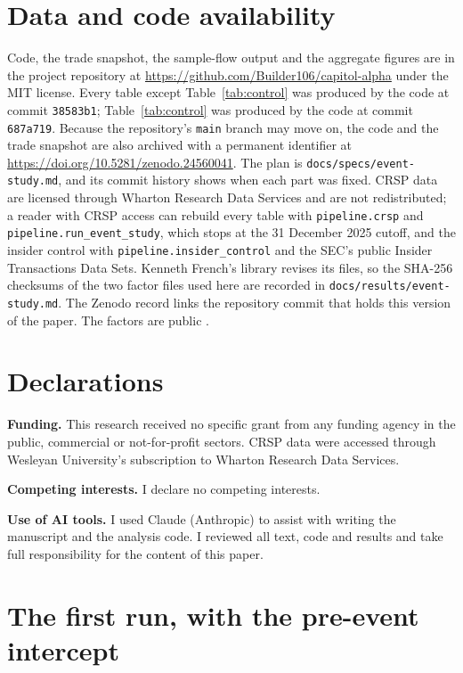 \documentclass[11pt]{article}
\begin{document}
\section*{Data and code availability}

Code, the trade snapshot, the sample-flow output and the aggregate figures are in the project repository at \url{https://github.com/Builder106/capitol-alpha} under the MIT license. Every table except Table~\ref{tab:control} was produced by the code at commit \texttt{38583b1}; Table~\ref{tab:control} was produced by the code at commit \texttt{687a719}. Because the repository's \texttt{main} branch may move on, the code and the trade snapshot are also archived with a permanent identifier at \url{https://doi.org/10.5281/zenodo.24560041}. The plan is \texttt{docs/specs/event-study.md}, and its commit history shows when each part was fixed. CRSP data are licensed through Wharton Research Data Services and are not redistributed; a reader with CRSP access can rebuild every table with \texttt{pipeline.crsp} and \texttt{pipeline.run\_event\_study}, which stops at the 31 December 2025 cutoff, and the insider control with \texttt{pipeline.insider\_control} and the SEC's public Insider Transactions Data Sets. Kenneth French's library revises its files, so the SHA-256 checksums of the two factor files used here are recorded in \texttt{docs/results/event-study.md}. The Zenodo record links the repository commit that holds this version of the paper. The factors are public \citep{french2026data}.

\section*{Declarations}

\noindent\textbf{Funding.} This research received no specific grant from any funding agency in the public, commercial or not-for-profit sectors. CRSP data were accessed through Wesleyan University's subscription to Wharton Research Data Services.

\medskip
\noindent\textbf{Competing interests.} I declare no competing interests.

\medskip
\noindent\textbf{Use of AI tools.} I used Claude (Anthropic) to assist with writing the manuscript and the analysis code. I reviewed all text, code and results and take full responsibility for the content of this paper.




\appendix
\section{The first run, with the pre-event intercept}
\end{document}
